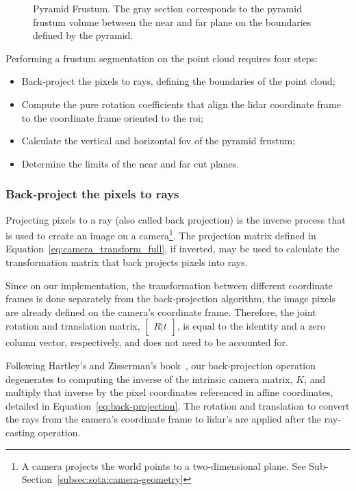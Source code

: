 \begin{figure}[H]
	\centering
	\def\svgwidth{0.3\columnwidth}
	\graphicspath{{img/image-object-to-point-cloud/}}
	
	\caption[Representation of a pyramid frustum.]{Pyramid Frustum. The gray section corresponds to the pyramid frustum volume between the near and far plane on the boundaries defined by the pyramid.}
	\label{fig:pyramid-frustum}
\end{figure}

Performing a frustum segmentation on the point cloud requires four steps:

\begin{itemize}
	\item Back-project the pixels to rays, defining the boundaries of the point cloud;
	\item Compute the pure rotation coefficients that align the \ac{lidar} coordinate frame to the coordinate frame oriented to the \ac{roi};
	\item Calculate the vertical and horizontal \acf{fov} of the pyramid frustum;
	\item Determine the limits of the near and far cut planes.
\end{itemize}

\subsubsection{Back-project the pixels to rays}
Projecting pixels to a ray (also called back projection) is the inverse process that is used to create an image on a camera\footnote{A camera projects the world points to a two-dimensional plane. See Sub-Section~\ref{subsec:sota:camera-geometry}}. The projection matrix defined in Equation~\eqref{eq:camera_transform_full}, if inverted, may be used to calculate the transformation matrix that  back projects pixels into rays.

Since on our implementation, the transformation between different coordinate frames is done separately from the back-projection algorithm, the image pixels are already defined on the camera's coordinate frame. Therefore, the joint rotation and translation matrix, $\begin{bmatrix} R|t \end{bmatrix}$, is equal to the identity and a zero column vector, respectively, and does not need to be accounted for.

Following Hartley's and Zisserman's book~\cite{mvg_book}, our back-projection operation degenerates to computing the inverse of the intrinsic camera matrix, $K$, and multiply that inverse by the pixel coordinates referenced in affine coordinates, detailed in Equation~\eqref{eq:back-projection}. The rotation and translation to convert the rays from the camera's coordinate frame to \ac{lidar}'s are applied after the ray-casting operation.

